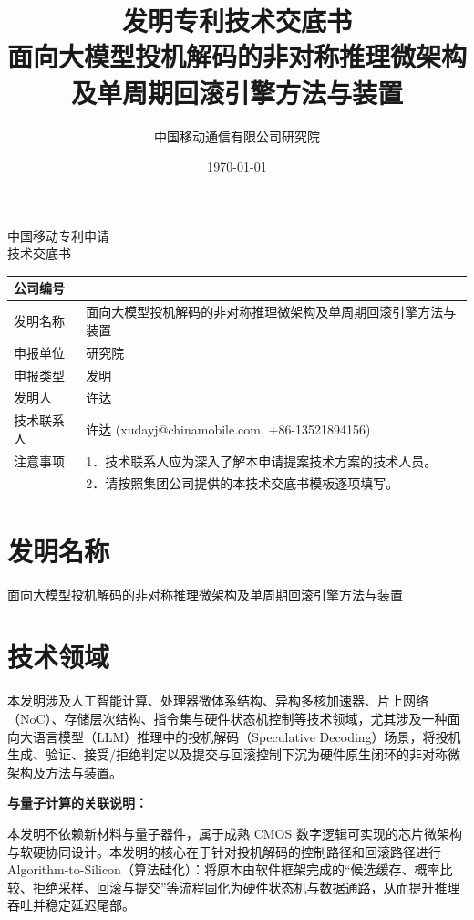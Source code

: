 \documentclass[12pt,a4paper]{article}
\title{\textbf{发明专利技术交底书} \\[0.5em]
\Large 面向大模型投机解码的非对称推理微架构及单周期回滚引擎方法与装置}
\author{中国移动通信有限公司研究院}
\date{\today}
\begin{document}
\begin{center}
    {\Large\heiti 中国移动专利申请} \\[1em]
    {\Huge\heiti 技术交底书} \\[1em]
\end{center}

\noindent
\begin{tabular}{|p{3cm}|p{12cm}|}
\hline
公司编号 &  \\
\hline
发明名称 & 面向大模型投机解码的非对称推理微架构及单周期回滚引擎方法与装置 \\
\hline
申报单位 & 研究院 \\
\hline
申报类型 & 发明 \\
\hline
发明人 & 许达 \\
\hline
技术联系人 & 许达 (xudayj@chinamobile.com, +86-13521894156) \\
\hline
注意事项 & 1．技术联系人应为深入了解本申请提案技术方案的技术人员。 \\
         & 2．请按照集团公司提供的本技术交底书模板逐项填写。 \\
\hline
\end{tabular}

\vspace{1cm}

\section{发明名称}

面向大模型投机解码的非对称推理微架构及单周期回滚引擎方法与装置


\section{技术领域}

本发明涉及人工智能计算、处理器微体系结构、异构多核加速器、片上网络（NoC）、存储层次结构、指令集与硬件状态机控制等技术领域，尤其涉及一种面向大语言模型（LLM）推理中的投机解码（Speculative Decoding）场景，将投机生成、验证、接受/拒绝判定以及提交与回滚控制下沉为硬件原生闭环的非对称微架构及方法与装置。

\textbf{与量子计算的关联说明：}

本发明不依赖新材料与量子器件，属于成熟 CMOS 数字逻辑可实现的芯片微架构与软硬协同设计。本发明的核心在于针对投机解码的控制路径和回滚路径进行 Algorithm-to-Silicon（算法硅化）：将原本由软件框架完成的“候选缓存、概率比较、拒绝采样、回滚与提交”等流程固化为硬件状态机与数据通路，从而提升推理吞吐并稳定延迟尾部。
\end{document}
